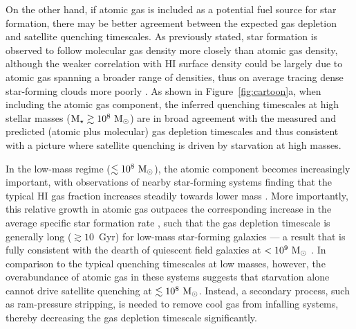 On the other hand, if atomic gas is included as a potential fuel
source for star formation, there may be better agreement between the
expected gas depletion and satellite quenching timescales. As
previously stated, star formation is observed to follow molecular gas
density more closely than atomic gas density, although the weaker
correlation with H{\scriptsize I} surface density could be largely due
to atomic gas spanning a broader range of densities, thus on average
tracing dense star-forming clouds more poorly \citep{glover12a,
  glover12b, clark12}. As shown in Figure~\ref{fig:cartoon}a, when
including the atomic gas component, the inferred quenching timescales
at high stellar masses (${\rm M}_{\star} \gtrsim 10^{8}~{\rm M}_{\odot}$) are in broad
agreement with the measured and predicted (atomic plus molecular) gas
depletion timescales and thus consistent with a picture where
satellite quenching is driven by starvation at high masses.



In the low-mass regime ($\lesssim10^{8}~{\rm M}_{\odot}$), the atomic component
becomes increasingly important, with observations of nearby
star-forming systems finding that the typical H{\scriptsize I} gas
fraction increases steadily towards lower mass \citep{skillman03,
  geha06, leroy08, schiminovich10, catinella10, huang12}. More
importantly, this relative growth in atomic gas outpaces the
corresponding increase in the average specific star formation rate
\citep[e.g.][]{noeske07, salim07, speagle14}, such that the gas
depletion timescale is generally long ($\gtrsim 10$~Gyr) for low-mass
star-forming galaxies --- a result that is fully consistent with the
dearth of quiescent field galaxies at $<10^{9}~{\rm M}_{\odot}$ \citep{geha12,
  onorbe15}. In comparison to the typical quenching timescales at low
masses, however, the overabundance of atomic gas in these systems
suggests that starvation alone cannot drive satellite quenching at
$\lesssim10^{8}~{\rm M}_{\odot}$. Instead, a secondary process, such as
ram-pressure stripping, is needed to remove cool gas from infalling
systems, thereby decreasing the gas depletion timescale significantly.



